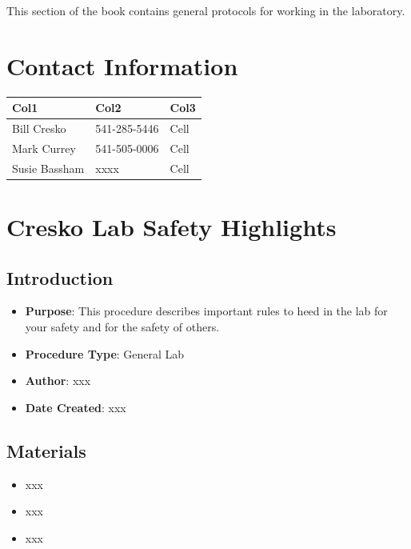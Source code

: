 \documentclass[
  letterpaper,
  DIV=11,
  numbers=noendperiod]{scrreprt}
\begin{document}
This section of the book contains general protocols for working in the
laboratory.

\hypertarget{sec-general-contact}{%
\chapter{Contact Information}\label{sec-general-contact}}

\begin{longtable}[]{@{}lll@{}}
\toprule\noalign{}
Col1 & Col2 & Col3 \\
\midrule\noalign{}
\endhead
\bottomrule\noalign{}
\endlastfoot
Bill Cresko & 541-285-5446 & Cell \\
Mark Currey & 541-505-0006 & Cell \\
Susie Bassham & xxxx & Cell \\
\end{longtable}

\hypertarget{sec-general-lab_safety}{%
\chapter{Cresko Lab Safety Highlights}\label{sec-general-lab_safety}}

\hypertarget{introduction}{%
\section{Introduction}\label{introduction}}

\begin{itemize}
\item
  \textbf{Purpose}: This procedure describes important rules to heed in
  the lab for your safety and for the safety of others.
\item
  \textbf{Procedure Type}: General Lab
\item
  \textbf{Author}: xxx
\item
  \textbf{Date Created}: xxx
\end{itemize}

\hypertarget{materials}{%
\section{Materials}\label{materials}}

\begin{itemize}
\item
  xxx
\item
  xxx
\item
  xxx
\end{itemize}
\end{document}
